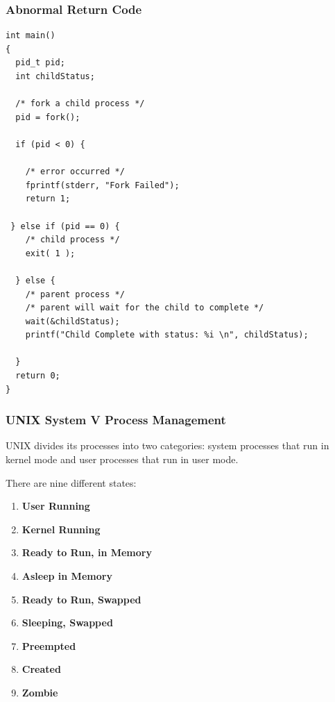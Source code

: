 \begin{frame}[fragile]
\frametitle{Abnormal Return Code}
{\scriptsize
\begin{verbatim}
int main()
{
  pid_t pid;
  int childStatus;

  /* fork a child process */
  pid = fork();
  
  if (pid < 0) { 
  
    /* error occurred */ 
    fprintf(stderr, "Fork Failed"); 
    return 1;
    
 } else if (pid == 0) {  
    /* child process */
    exit( 1 );
    
  } else {
    /* parent process */
    /* parent will wait for the child to complete */
    wait(&childStatus);
    printf("Child Complete with status: %i \n", childStatus);
    
  }   
  return 0;
}
\end{verbatim}

}

\end{frame}

\begin{frame}
\frametitle{UNIX System V Process Management}

UNIX divides its processes into two categories: system processes that run in kernel mode and user processes that run in user mode.

There are nine different states:

\begin{enumerate}
	\item \textbf{User Running}
	\item \textbf{Kernel Running}
	\item \textbf{Ready to Run, in Memory}
	\item \textbf{Asleep in Memory}
	\item \textbf{Ready to Run, Swapped}
	\item \textbf{Sleeping, Swapped}
	\item \textbf{Preempted}
	\item \textbf{Created}
	\item \textbf{Zombie}
\end{enumerate}


\end{frame}

